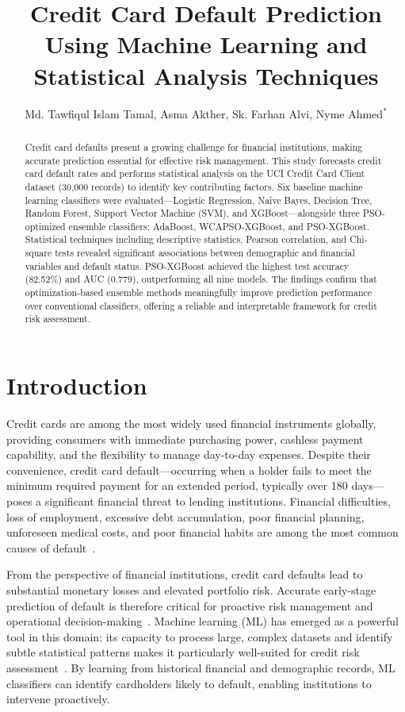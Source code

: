 \documentclass[sigconf]{acmart}
\title{Credit Card Default Prediction Using Machine Learning and Statistical Analysis Techniques}
\author{Md. Tawfiqul Islam Tamal, Asma Akther, Sk. Farhan Alvi, Nyme Ahmed$^*$}
\affiliation{%
  \institution{$^1$Dept. of Computer Science, American International University-Bangladesh}
  \city{Dhaka}
  \country{Bangladesh}
}
\begin{document}
\begin{abstract}
Credit card defaults present a growing challenge for financial institutions, making accurate prediction essential for effective risk management. This study forecasts credit card default rates and performs statistical analysis on the UCI Credit Card Client dataset (30,000 records) to identify key contributing factors. Six baseline machine learning classifiers were evaluated---Logistic Regression, Na\"{i}ve Bayes, Decision Tree, Random Forest, Support Vector Machine (SVM), and XGBoost---alongside three PSO-optimized ensemble classifiers: AdaBoost, WCAPSO-XGBoost, and PSO-XGBoost. Statistical techniques including descriptive statistics, Pearson correlation, and Chi-square tests revealed significant associations between demographic and financial variables and default status. PSO-XGBoost achieved the highest test accuracy (82.52\%) and AUC (0.779), outperforming all nine models. The findings confirm that optimization-based ensemble methods meaningfully improve prediction performance over conventional classifiers, offering a reliable and interpretable framework for credit risk assessment.
\end{abstract}

\maketitle

\section{Introduction}

Credit cards are among the most widely used financial instruments globally, providing consumers with immediate purchasing power, cashless payment capability, and the flexibility to manage day-to-day expenses. Despite their convenience, credit card default---occurring when a holder fails to meet the minimum required payment for an extended period, typically over 180 days---poses a significant financial threat to lending institutions. Financial difficulties, loss of employment, excessive debt accumulation, poor financial planning, unforeseen medical costs, and poor financial habits are among the most common causes of default~\cite{chen2023}.

From the perspective of financial institutions, credit card defaults lead to substantial monetary losses and elevated portfolio risk. Accurate early-stage prediction of default is therefore critical for proactive risk management and operational decision-making~\cite{west2000credit}. Machine learning (ML) has emerged as a powerful tool in this domain: its capacity to process large, complex datasets and identify subtle statistical patterns makes it particularly well-suited for credit risk assessment~\cite{baesens2003benchmarking,lessmann2015benchmarking}. By learning from historical financial and demographic records, ML classifiers can identify cardholders likely to default, enabling institutions to intervene proactively.
\end{document}
